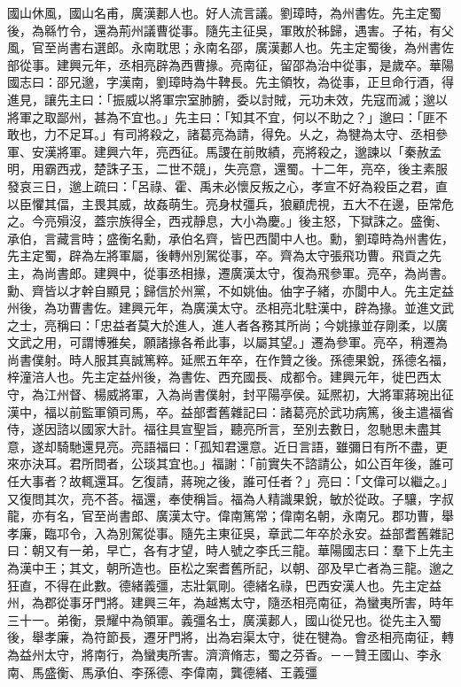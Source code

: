 \begin{pinyinscope}
國山休風，國山名甫，廣漢郪人也。好人流言議。劉璋時，為州書佐。先主定蜀後，為緜竹令，還為荊州議曹從事。隨先主征吳，軍敗於秭歸，遇害。子祐，有父風，官至尚書右選郎。永南耽思；永南名邵，廣漢郪人也。先主定蜀後，為州書佐部從事。建興元年，丞相亮辟為西曹掾。亮南征，留邵為治中從事，是歲卒。華陽國志曰：邵兄邈，字漢南，劉璋時為牛鞞長。先主領牧，為從事，正旦命行酒，得進見，讓先主曰：「振威以將軍宗室肺腑，委以討賊，元功未效，先寇而滅；邈以將軍之取鄙州，甚為不宜也。」先主曰：「知其不宜，何以不助之？」邈曰：「匪不敢也，力不足耳。」有司將殺之，諸葛亮為請，得免。乆之，為犍為太守、丞相參軍、安漢將軍。建興六年，亮西征。馬謖在前敗績，亮將殺之，邈諫以「秦赦孟明，用霸西戎，楚誅子玉，二世不競」，失亮意，還蜀。十二年，亮卒，後主素服發哀三日，邈上疏曰：「呂祿、霍、禹未必懷反叛之心，孝宣不好為殺臣之君，直以臣懼其偪，主畏其威，故姦萌生。亮身杖彊兵，狼顧虎視，五大不在邊，臣常危之。今亮殞沒，蓋宗族得全，西戎靜息，大小為慶。」後主怒，下獄誅之。盛衡、承伯，言藏言時；盛衡名勳，承伯名齊，皆巴西閬中人也。勳，劉璋時為州書佐，先主定蜀，辟為左將軍屬，後轉州別駕從事，卒。齊為太守張飛功曹。飛貢之先主，為尚書郎。建興中，從事丞相掾，遷廣漢太守，復為飛參軍。亮卒，為尚書。勳、齊皆以才幹自顯見；歸信於州黨，不如姚伷。伷字子緒，亦閬中人。先主定益州後，為功曹書佐。建興元年，為廣漢太守。丞相亮北駐漢中，辟為掾。並進文武之士，亮稱曰：「忠益者莫大於進人，進人者各務其所尚；今姚掾並存剛柔，以廣文武之用，可謂博雅矣，願諸掾各希此事，以屬其望。」遷為參軍。亮卒，稍遷為尚書僕射。時人服其真誠篤粹。延熈五年卒，在作贊之後。孫德果銳，孫德名福，梓潼涪人也。先主定益州後，為書佐、西充國長、成都令。建興元年，徙巴西太守，為江州督、楊威將軍，入為尚書僕射，封平陽亭侯。延熈初，大將軍蔣琬出征漢中，福以前監軍領司馬，卒。益部耆舊雜記曰：諸葛亮於武功病篤，後主遣福省侍，遂因諮以國家大計。福往具宣聖旨，聽亮所言，至別去數日，忽馳思未盡其意，遂却騎馳還見亮。亮語福曰：「孤知君還意。近日言語，雖彌日有所不盡，更來亦決耳。君所問者，公琰其宜也。」福謝：「前實失不諮請公，如公百年後，誰可任大事者？故輒還耳。乞復請，蔣琬之後，誰可任者？」亮曰：「文偉可以繼之。」又復問其次，亮不荅。福還，奉使稱旨。福為人精識果銳，敏於從政。子驤，字叔龍，亦有名，官至尚書郎、廣漢太守。偉南篤常；偉南名朝，永南兄。郡功曹，舉孝廉，臨邛令，入為別駕從事。隨先主東征吳，章武二年卒於永安。益部耆舊雜記曰：朝又有一弟，早亡，各有才望，時人號之李氏三龍。華陽國志曰：羣下上先主為漢中王；其文，朝所造也。臣松之案耆舊所記，以朝、邵及早亡者為三龍。邈之狂直，不得在此數。德緒義彊，志壯氣剛。德緒名祿，巴西安漢人也。先主定益州，為郡從事牙門將。建興三年，為越嶲太守，隨丞相亮南征，為蠻夷所害，時年三十一。弟衡，景耀中為領軍。義彊名士，廣漢郪人，國山從兄也。從先主入蜀後，舉孝廉，為符節長，遷牙門將，出為宕渠太守，徙在犍為。會丞相亮南征，轉為益州太守，將南行，為蠻夷所害。濟濟脩志，蜀之芬香。－－贊王國山、李永南、馬盛衡、馬承伯、李孫德、李偉南，龔德緒、王義彊


\end{pinyinscope}
